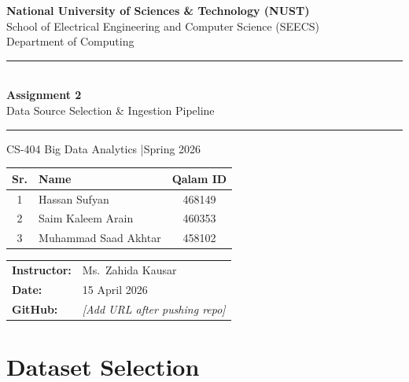 \documentclass[12pt, a4paper]{article}
\newcommand{\ph}[1]{{\color{phred}\textit{[#1]}}}
\begin{document}
\begin{titlepage}
\centering
\vspace*{2cm}

{\large\bfseries National University of Sciences \& Technology (NUST)}\\[4pt]
{\normalsize School of Electrical Engineering and Computer Science (SEECS)}\\[2pt]
{\normalsize Department of Computing}

\vspace{1.2cm}
{\color{primary}\rule{0.75\linewidth}{1.2pt}}\\[12pt]
{\huge\bfseries\color{primary} Assignment 2}\\[8pt]
{\LARGE Data Source Selection \& Ingestion Pipeline}\\[12pt]
{\color{primary}\rule{0.75\linewidth}{1.2pt}}

\vspace{0.8cm}
{\large CS-404 Big Data Analytics \quad|\quad Spring 2026}

\vspace{1.4cm}
\begin{tabular}{clc}
\toprule
\textbf{Sr.} & \textbf{Name} & \textbf{Qalam ID} \\
\midrule
1 & Hassan Sufyan        & 468149 \\
2 & Saim Kaleem Arain    & 460353 \\
3 & Muhammad Saad Akhtar & 458102 \\
\bottomrule
\end{tabular}

\vspace{1.2cm}
\renewcommand{\arraystretch}{1.4}
\begin{tabular}{@{}ll}
\textbf{Instructor:} & Ms.\ Zahida Kausar \\
\textbf{Date:}       & 15 April 2026 \\
\textbf{GitHub:}     & \ph{Add URL after pushing repo} \\
\end{tabular}

\vfill
\end{titlepage}

\tableofcontents
\newpage

\section{Dataset Selection}
\end{document}
